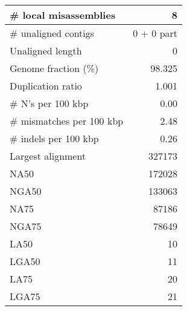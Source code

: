 \documentclass[12pt,a4paper]{article}
\begin{document}
\begin{table}[ht]
\begin{center}
\begin{tabular}{|l*{1}{|r}|}
\# local misassemblies & 8 \\ \hline
\# unaligned contigs & 0 + 0 part \\ \hline
Unaligned length & 0 \\ \hline
Genome fraction (\%) & 98.325 \\ \hline
Duplication ratio & 1.001 \\ \hline
\# N's per 100 kbp & 0.00 \\ \hline
\# mismatches per 100 kbp & 2.48 \\ \hline
\# indels per 100 kbp & 0.26 \\ \hline
Largest alignment & 327173 \\ \hline
NA50 & 172028 \\ \hline
NGA50 & 133063 \\ \hline
NA75 & 87186 \\ \hline
NGA75 & 78649 \\ \hline
LA50 & 10 \\ \hline
LGA50 & 11 \\ \hline
LA75 & 20 \\ \hline
LGA75 & 21 \\ \hline
\end{tabular}
\end{center}
\end{table}
\end{document}

